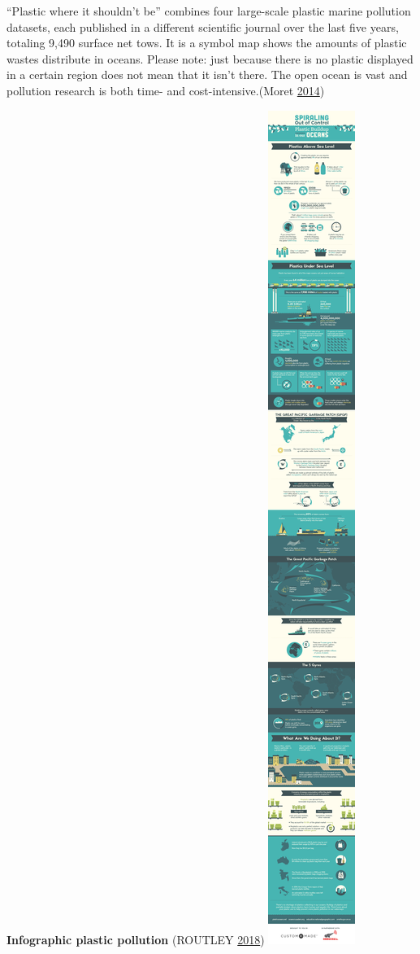 \documentclass[]{book}
\begin{document}
``Plastic where it shouldn't be'' combines four large-scale plastic marine pollution datasets, each published in a different scientific journal over the last five years, totaling 9,490 surface net tows. It is a symbol map shows the amounts of plastic wastes distribute in oceans. Please note: just because there is no plastic displayed in a certain region does not mean that it isn't there. The open ocean is vast and pollution research is both time- and cost-intensive.(Moret \protect\hyperlink{ref-ocean_plastic_pollution}{2014})

\textbf{Infographic plastic pollution} (ROUTLEY \protect\hyperlink{ref-plastic_pollution_infographics}{2018})
\includegraphics{images/infographic-plastic-buildup.jpg}
\end{document}
